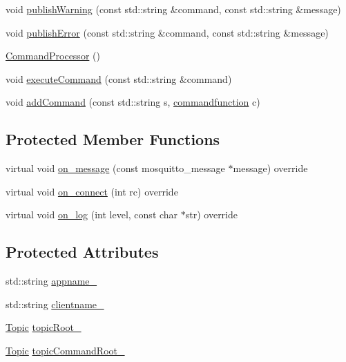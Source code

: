\begin{DoxyCompactItemize}
void \hyperlink{class_command_processor_a0691a985030ebb0cef833aa779bedeab}{publish\+Warning} (const std\+::string \&command, const std\+::string \&message)
\item 
void \hyperlink{class_command_processor_a81e3fda8d03c8f5aea99a442ebdb0050}{publish\+Error} (const std\+::string \&command, const std\+::string \&message)
\item 
\hyperlink{class_command_processor_a5643028cf10be143aab4e42939b22880}{Command\+Processor} ()
\item 
void \hyperlink{class_command_processor_a3a830f1939e458f31f0cd2d42855609f}{execute\+Command} (const std\+::string \&command)
\item 
void \hyperlink{class_command_processor_a67598e9086a7c3a7228c078acb7f4eab}{add\+Command} (const std\+::string s, \hyperlink{_command_processor_8h_a28db7178a71eff1027c055c9b19f6215}{commandfunction} c)
\end{DoxyCompactItemize}
\subsection*{Protected Member Functions}
\begin{DoxyCompactItemize}
\item 
virtual void \hyperlink{class_command_processor_ab1a2cf5d74c8bbd9bbcf57c7a4b14c66}{on\+\_\+message} (const mosquitto\+\_\+message $\ast$message) override
\item 
virtual void \hyperlink{class_command_processor_a242db95796f5dd1b17a139ed19d6ecfa}{on\+\_\+connect} (int rc) override
\item 
virtual void \hyperlink{class_command_processor_a7300ca2e9cd0237f17ce82f64123e553}{on\+\_\+log} (int level, const char $\ast$str) override
\end{DoxyCompactItemize}
\subsection*{Protected Attributes}
\begin{DoxyCompactItemize}
\item 
std\+::string \hyperlink{class_command_processor_aab13edb02dbcc123e831e1cce20695a0}{appname\+\_\+}
\item 
std\+::string \hyperlink{class_command_processor_a3922d658643297c47765181a251b10d3}{clientname\+\_\+}
\item 
\hyperlink{class_topic}{Topic} \hyperlink{class_command_processor_a97f0d615c62c8c7e1712522c4577ea53}{topic\+Root\+\_\+}
\item 
\hyperlink{class_topic}{Topic} \hyperlink{class_command_processor_ac695d4ff50c2dd91b25c8079b22170e4}{topic\+Command\+Root\+\_\+}
\end{DoxyCompactItemize}


